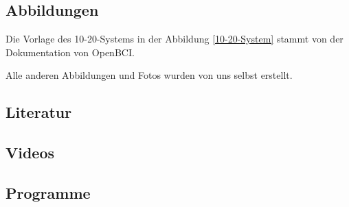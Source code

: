 \documentclass[11pt]{scrartcl}
\begin{document}
	\subsection{Abbildungen}

	Die Vorlage des 10-20-Systems in der Abbildung \ref{10-20-System} stammt von der Dokumentation von OpenBCI. \cite{OpenBCI}
	
	Alle anderen Abbildungen und Fotos wurden von uns selbst erstellt.

	\subsection{Literatur}
	\printbibliography[heading=none, keyword={Literatur}, notkeyword={YTVideos}]

	\subsection{Videos}
	\printbibliography[heading=none, keyword={YTVideos}]

	\subsection{Programme}
	\printbibliography[heading=none, keyword=Programme]
\end{document}

